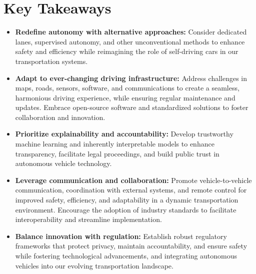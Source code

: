 \section{Key Takeaways}

\begin{itemize}
\item \textbf{Redefine autonomy with alternative approaches:} Consider dedicated lanes, supervised autonomy, and other unconventional methods to enhance safety and efficiency while reimagining the role of self-driving cars in our transportation systems.
\item \textbf{Adapt to ever-changing driving infrastructure:} Address challenges in maps, roads, sensors, software, and communications to create a seamless, harmonious driving experience, while ensuring regular maintenance and updates. Embrace open-source software and standardized solutions to foster collaboration and innovation.
\item \textbf{Prioritize explainability and accountability:} Develop trustworthy machine learning and inherently interpretable models to enhance transparency, facilitate legal proceedings, and build public trust in autonomous vehicle technology.
\item \textbf{Leverage communication and collaboration:} Promote vehicle-to-vehicle communication, coordination with external systems, and remote control for improved safety, efficiency, and adaptability in a dynamic transportation environment. Encourage the adoption of industry standards to facilitate interoperability and streamline implementation.
\item \textbf{Balance innovation with regulation:} Establish robust regulatory frameworks that protect privacy, maintain accountability, and ensure safety while fostering technological advancements, and integrating autonomous vehicles into our evolving transportation landscape.
\end{itemize}
